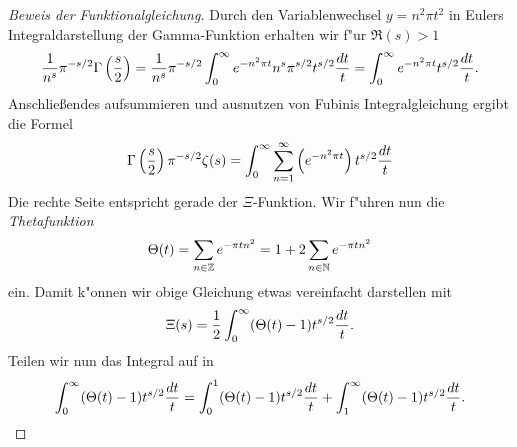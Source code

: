 	\begin{proof}[Beweis der Funktionalgleichung]
		Durch den Variablenwechsel $y=n^2\pi t^2$ in Eulers Integraldarstellung der Gamma-Funktion erhalten wir f"ur $\Re(s)>1$
		\begin{align*}
			\frac{1}{n^s} \pi^{-s/2}\Gamma\left(\frac{s}{2}\right) 
				= \frac{1}{n^s} \pi^{-s/2} \int_0^{\infty} e^{-n^2\pi t} n^s\pi^{s/2} t^{s/2} \frac{\dx[t]}{t} 
				= \int_{0}^{\infty} e^{-n^2\pi t}t^{s/2} \frac{\dx[t]}{t}.
		\end{align*}
		Anschließendes aufsummieren und ausnutzen von Fubinis Integralgleichung ergibt die Formel
		\begin{align*}
			\Gamma\left(\frac{s}{2}\right)\pi^{-s/2}\zeta(s) 
				= \int_{0}^{\infty} \sum_{n=1}^{\infty}\left(e^{-n^2\pi t}\right)t^{s/2} \frac{\dx[t]}{t}
		\end{align*}
		Die rechte Seite entspricht gerade der $\Xi$-Funktion. Wir f"uhren nun die \emph{Thetafunktion}
		\begin{align*}
			\Theta(t) = \sum_{n\in \Z} e^{-\pi t n^2} = 1 + 2 \sum_{n\in\N}e^{-\pi t n^2}
		\end{align*}
		ein.
		Damit k"onnen wir obige Gleichung etwas vereinfacht darstellen mit
		\begin{align*}
			\Xi(s) 
				= \frac{1}{2}\int_{0}^{\infty}(\Theta(t)-1)t^{s/2} \frac{\dx[t]}{t}.
		\end{align*}
		Teilen wir nun das Integral auf in
		\begin{align}
			\int_{0}^{\infty} (\Theta(t) - 1) t^{s/2}  \frac{\dx[t]}{t} = \int_{0}^{1} (\Theta(t) - 1) t^{s/2}  \frac{\dx[t]}{t} + \int_{1}^{\infty} (\Theta(t) - 1) t^{s/2}  \frac{\dx[t]}{t}.\label{eq:einleitung:riemann1}
		\end{align}

\end{proof}
